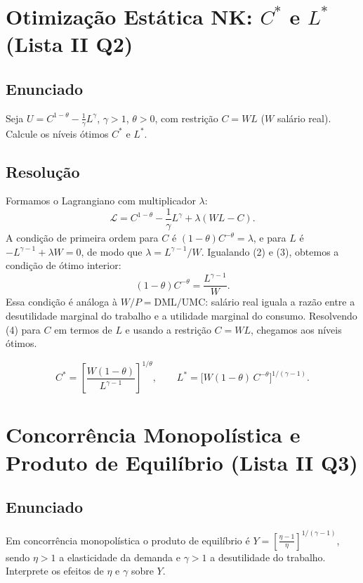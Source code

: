 \documentclass[12pt, a4paper]{article}
\begin{document}
\section{Otimização Estática NK: $C^*$ e $L^*$ (Lista II Q2)}

\subsection*{Enunciado}
Seja $U = C^{1-\theta} - \tfrac{1}{\gamma}L^\gamma$, $\gamma>1$, $\theta>0$, com restrição $C = WL$ ($W$ salário real). Calcule os níveis ótimos $C^*$ e $L^*$.

\subsection*{Resolução}

Formamos o Lagrangiano com multiplicador $\lambda$:
\[
\mathcal{L} = C^{1-\theta} - \frac{1}{\gamma}L^\gamma + \lambda(WL - C). \tag{1}
\]
A condição de primeira ordem para $C$ é $(1-\theta)C^{-\theta} = \lambda$,  e para $L$ é $-L^{\gamma-1} + \lambda W = 0$, de modo que $\lambda = L^{\gamma-1}/W$.  Igualando (2) e (3), obtemos a condição de ótimo interior:
\[
(1-\theta)C^{-\theta} = \frac{L^{\gamma-1}}{W}. \tag{4}
\]
Essa condição é análoga à $W/P = \text{DML}/\text{UMC}$: salário real iguala a razão entre a desutilidade marginal do trabalho e a utilidade marginal do consumo. Resolvendo (4) para $C$ em termos de $L$ e usando a restrição $C = WL$, chegamos aos níveis ótimos.

\begin{resultbox}[title={Ótimos $C^*$ e $L^*$ (Lista II Q2)}]
\[
C^* = \left[\frac{W(1-\theta)}{L^{\gamma-1}}\right]^{1/\theta}, \qquad L^* = \bigl[W(1-\theta)\,C^{-\theta}\bigr]^{1/(\gamma-1)}.
\]
\end{resultbox}

\section{Concorrência Monopolística e Produto de Equilíbrio (Lista II Q3)}

\subsection*{Enunciado}
Em concorrência monopolística o produto de equilíbrio é $Y = \left[\tfrac{\eta-1}{\eta}\right]^{1/(\gamma-1)}$, sendo $\eta>1$ a elasticidade da demanda e $\gamma>1$ a desutilidade do trabalho. Interprete os efeitos de $\eta$ e $\gamma$ sobre $Y$.
\end{document}
